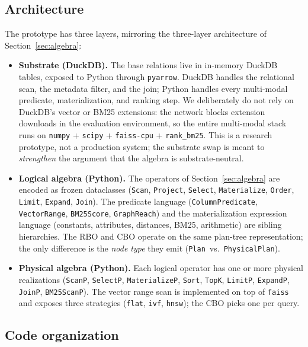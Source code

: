 \documentclass[sigconf,nonacm,review]{acmart}
\theoremstyle{plain}
\theoremstyle{definition}
\theoremstyle{remark}
\begin{document}
\subsection{Architecture}\label{app:proto:arch}

The prototype has three layers, mirroring the three-layer
architecture of Section~\ref{sec:algebra}:

\begin{itemize}[leftmargin=*]
  \item \textbf{Substrate (DuckDB).} The base relations live in
    in-memory DuckDB tables, exposed to Python through
    \texttt{pyarrow}. DuckDB handles the relational scan, the
    metadata filter, and the join; Python handles every
    multi-modal predicate, materialization, and ranking step.
    We deliberately do not rely on DuckDB's vector or BM25
    extensions: the network blocks extension downloads in the
    evaluation environment, so the entire multi-modal stack
    runs on \texttt{numpy} + \texttt{scipy} + \texttt{faiss-cpu}
    + \texttt{rank\_bm25}. This is a research prototype, not a
    production system; the substrate swap is meant to
    \emph{strengthen} the argument that the algebra is
    substrate-neutral.
  \item \textbf{Logical algebra (Python).} The operators of
    Section~\ref{sec:algebra} are encoded as frozen dataclasses
    (\texttt{Scan}, \texttt{Project}, \texttt{Select},
    \texttt{Materialize}, \texttt{Order}, \texttt{Limit},
    \texttt{Expand}, \texttt{Join}). The predicate language
    (\texttt{ColumnPredicate}, \texttt{VectorRange},
    \texttt{BM25Score}, \texttt{GraphReach}) and the
    materialization expression language (constants,
    attributes, distances, BM25, arithmetic) are sibling
    hierarchies. The RBO and CBO operate on the same
    plan-tree representation; the only difference is the
    \emph{node type} they emit (\texttt{Plan}~vs.\
    \texttt{PhysicalPlan}).
  \item \textbf{Physical algebra (Python).} Each logical
    operator has one or more physical realizations
    (\texttt{ScanP}, \texttt{SelectP}, \texttt{MaterializeP},
    \texttt{Sort}, \texttt{TopK}, \texttt{LimitP},
    \texttt{ExpandP}, \texttt{JoinP}, \texttt{BM25ScanP}). The
    vector range scan is implemented on top of \texttt{faiss}
    and exposes three strategies (\texttt{flat}, \texttt{ivf},
    \texttt{hnsw}); the CBO picks one per query.
\end{itemize}

\subsection{Code organization}\label{app:proto:code}
\end{document}
